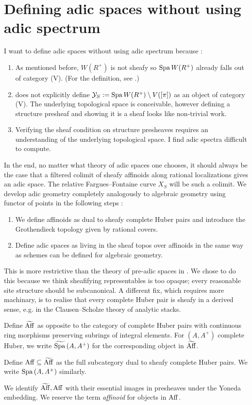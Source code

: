 \documentclass{article}
\begin{document}
\section{Defining adic spaces without using adic spectrum}

I want to define adic spaces without using adic spectrum
because : 
\begin{enumerate}
  \item As mentioned before, $W(R^+)$ is not sheafy so
  $\mathrm{Spa}\, W(R^+)$ already falls out of 
  category (V). (For the definition, see \cite[Def. 3.2.1]{SW20}.)
  \item \cite[Prop. 11.2.1]{SW20} does not explicitly define
  $\mathcal{Y}_S := \mathrm{Spa}\, W(R^+) \setminus V([\pi])$ 
  as an object of category (V).
  The underlying topological space is conceivable,
  however defining a structure presheaf and showing it is a sheaf
  looks like non-trivial work.
  \item Verifying the sheaf condition on structure presheaves
  requires an understanding of the underlying topological space.
  I find adic spectra difficult to compute.
\end{enumerate}
In the end,
no matter what theory of adic spaces one chooses,
it should always be the case that a filtered colimit of
sheafy affinoids along rational localizations gives an adic space.
The relative Fargues--Fontaine curve $X_S$ will be such a colimit.
We develop adic geometry completely analogously to 
algebraic geometry using functor of points in the following steps : 
\begin{enumerate}
  \item We define affinoids as
  dual to sheafy complete Huber pairs
  and introduce the Grothendieck topology given by rational covers.
  \item
  Define adic spaces as living in the sheaf topos over affinoids
  in the same way as schemes can be defined for algebraic geometry.
\end{enumerate}
This is more restrictive than 
the theory of pre-adic spaces in \cite[Section 3.4]{SW20}.
We chose to do this because 
we think sheafifying representables is too opaque;
every reasonable site structure should be subcanonical.
A different fix, which requires more machinary,
is to realise that
every complete Huber pair is sheafy in a derived sense,
e.g. in the Clausen--Scholze theory of analytic stacks.
\begin{dfn}
  
  Define $\widetilde{\mathrm{Aff}}$ as
  opposite to the category of complete Huber pairs
  with continuous ring morphisms preserving subrings of integral elements.
  For $(A , A^+)$ complete Huber,
  we write $\widetilde{\mathrm{Spa}\,}(A , A^+)$ for the corresponding object in
  $\widetilde{\mathrm{Aff}}$.

  Define $\mathrm{Aff} \subseteq \widetilde{\mathrm{Aff}}$ as the full subcategory
  dual to sheafy complete Huber pairs.
  We write $\mathrm{Spa}\, (A , A^+)$ similarly.

  We identify $\widetilde{\mathrm{Aff}} , \mathrm{Aff}$ with
  their essential images in presheaves under the Yoneda embedding.
  We reserve the term \emph{affinoid} for objects in $\mathrm{Aff}$.
\end{dfn}
\end{document}
